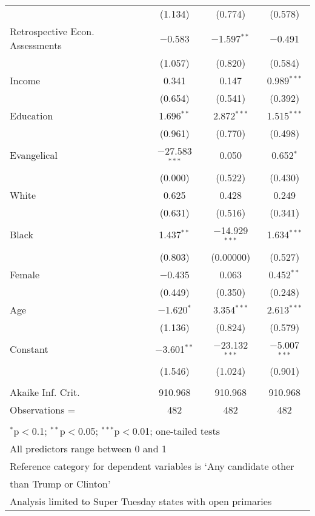 \documentclass[12pt]{article}
\begin{document}
\begin{appendices}
\begin{refsection}
\begin{table}[!t]
\begin{adjustbox}{width=0.6\textwidth,center}
\begin{tabular}{@{\extracolsep{5pt}}lccc}
  & (1.134) & (0.774) & (0.578) \\ 
 Retrospective Econ. Assessments & $-$0.583 & $-$1.597$^{**}$ & $-$0.491 \\ 
  & (1.057) & (0.820) & (0.584) \\ 
 Income & 0.341 & 0.147 & 0.989$^{***}$ \\ 
  & (0.654) & (0.541) & (0.392) \\ 
 Education & 1.696$^{**}$ & 2.872$^{***}$ & 1.515$^{***}$ \\ 
  & (0.961) & (0.770) & (0.498) \\ 
 Evangelical & $-$27.583$^{***}$ & 0.050 & 0.652$^{*}$ \\ 
  & (0.000) & (0.522) & (0.430) \\ 
 White & 0.625 & 0.428 & 0.249 \\ 
  & (0.631) & (0.516) & (0.341) \\ 
 Black & 1.437$^{**}$ & $-$14.929$^{***}$ & 1.634$^{***}$ \\ 
  & (0.803) & (0.00000) & (0.527) \\ 
 Female & $-$0.435 & 0.063 & 0.452$^{**}$ \\ 
  & (0.449) & (0.350) & (0.248) \\ 
 Age & $-$1.620$^{*}$ & 3.354$^{***}$ & 2.613$^{***}$ \\ 
  & (1.136) & (0.824) & (0.579) \\ 
 Constant & $-$3.601$^{**}$ & $-$23.132$^{***}$ & $-$5.007$^{***}$ \\ 
  & (1.546) & (1.024) & (0.901) \\ 
\hline \\[-1.8ex] 
Akaike Inf. Crit. & 910.968 & 910.968 & 910.968 \\ 
Observations =  & 482 & 482 & 482 \\
\hline 
\hline \\[-1.8ex] 
\multicolumn{4}{l}{\footnotesize $^{*}$p$<$0.1; $^{**}$p$<$0.05; $^{***}$p$<$0.01; one-tailed tests} \\ 
\multicolumn{4}{l}{\footnotesize All predictors range between 0 and 1} \\
\multicolumn{4}{l}{\footnotesize Reference category for dependent variables is `Any candidate other} \\
\multicolumn{4}{l}{\footnotesize \hspace{2pt} than Trump or Clinton'} \\
\multicolumn{4}{l}{\footnotesize Analysis limited to Super Tuesday states with open primaries}
\end{tabular} 
\end{adjustbox}
\end{table}





\end{refsection}
\end{appendices}
\end{document}
